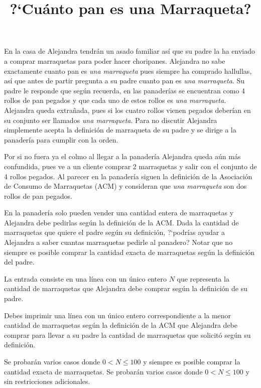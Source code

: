 \documentclass{oci}
\title{?`Cuánto pan es una Marraqueta?}
\begin{document}
\begin{problemDescription}
En la casa de Alejandra tendrán un asado familiar así que su padre la ha enviado
a comprar marraquetas para poder hacer choripanes. Alejandra
no sabe exactamente cuanto pan es \textit{una marraqueta} pues siempre ha comprado
hallullas, así que antes de partir pregunta a su padre cuanto pan es \textit{una
marraqueta}. Su padre le responde que según recuerda, en las panaderías se
encuentran como 4 rollos de pan pegados y que cada uno de estos rollos es
\textit{una marraqueta}. Alejandra queda extrañada, pues si los cuatro rollos vienen
pegados deberían en su conjunto ser llamados \textit{una marraqueta}. Para no discutir
Alejandra simplemente acepta la definición de marraqueta de su padre y se dirige
a la panadería para cumplir con la orden.

Por si no fuera ya el colmo al llegar a la panadería Alejandra queda aún más
confundida, pues ve a un cliente comprar 2 marraquetas y salir con el conjunto
de 4 rollos pegados. Al parecer en la panadería siguen la definición de la
Asociación de Consumo de Marraquetas (ACM) y consideran que \textit{una marraqueta} son
dos rollos de pan pegados. 

En la panadería solo pueden vender una cantidad entera de marraquetas y
Alejandra debe pedirlas según la definición de la ACM\@. Dada la cantidad de
marraquetas que quiere el padre según su definición, ?`podrías ayudar a
Alejandra a saber cuantas marraquetas pedirle al panadero? Notar que no siempre
es posible comprar la cantidad exacta de marraquetas según la definición del
padre.
\end{problemDescription}

\begin{inputDescription}
La entrada consiste en una línea con un único entero $N$ que representa la
cantidad de marraquetas que Alejandra debe comprar según la definición de su
padre.
\end{inputDescription}

\begin{outputDescription}
Debes imprimir una línea con un único entero correspondiente a la menor cantidad
de marraquetas según la definición de la ACM que Alejandra debe comprar para
llevar a su padre la cantidad de marraquetas que solicitó según su definición.
\end{outputDescription}

\begin{scoreDescription}
   Se probarán varios casos donde $0<N\leq 100$ y siempre es posible comprar la cantidad exacta de marraquetas. 
   Se probarán varios casos donde $0<N\leq 100$ y sin restricciones adicionales.
\end{scoreDescription}

\begin{sampleDescription}
\end{sampleDescription}
\end{document}
